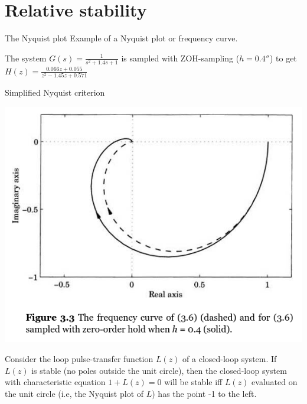 \documentclass[presentation,aspectratio=169]{beamer}
\begin{document}
\section{Relative stability}
\label{sec:org218756b}

\begin{frame}[label={sec:orgfe84823}]{The Nyquist plot}
Example of a \alert{Nyquist plot} or \alert{frequency curve}.
\begin{LaTeX}
\begin{center}
\end{center}
\end{LaTeX}



The system \(G(s) = \frac{1}{s^2 + 1.4s + 1}\) is sampled with ZOH-sampling (\(h=\unit{0.4}{\second}\)) to get \(H(z) = \frac{0.066z + 0.055}{z^2 - 1.45 z + 0.571}\)
\end{frame}

\begin{frame}[label={sec:orgbad54b5}]{Simplified Nyquist criterion}
\begin{center}
\includegraphics[width=0.4\linewidth]{../../figures/fig3-3.png}
\end{center}

Consider the loop pulse-transfer function \(L(z)\) of a closed-loop system. If \(L(z)\) is stable (no poles outside the unit circle), then the closed-loop system with characteristic equation \(1 + L(z) = 0\) will be stable iff \(L(z)\) evaluated on the unit circle (i.e, the Nyquist plot of \(L\)) has the point \alert{-1 to the left}.
\end{frame}
\end{document}
